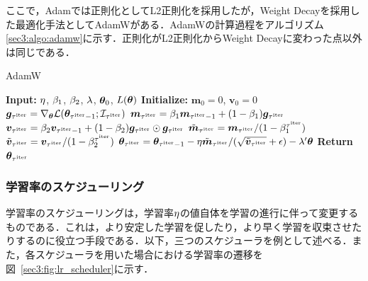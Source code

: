 \documentclass[12pt]{jarticle}
\numberwithin{equation}{section}    %
\numberwithin{figure}{section}      %
\numberwithin{table}{section}      %
\begin{document}
ここで，Adamでは正則化としてL2正則化を採用したが，Weight Decayを採用した最適化手法としてAdamW\cite{loshchilov2017decoupled}がある．AdamWの計算過程をアルゴリズム\ref{sec3:algo:adamw}に示す．正則化がL2正則化からWeight Decayに変わった点以外は同じである．
\begin{algorithm}
    \caption{AdamW}
    \label{sec3:algo:adamw}
    \begin{algorithmic}[1]
        \State \textbf{Input:} $\eta$, $\beta_{1}$, $\beta_{2}$, $\lambda$, $\bm{\theta}_{0}$, $L(\bm{\theta})$
        \State \textbf{Initialize:} $\bm{m}_{0} = 0$, $\bm{v}_{0} = 0$
        \State $\bm{g}_{\tau^{\text{iter}}} = \nabla_{\bm{\theta}} \mathcal{L}(\bm{\theta}_{\tau^{\text{iter}} - 1}; \mathcal{I}_{\tau^{\text{iter}}})$
        \State $\bm{m}_{\tau^{\text{iter}}} = \beta_{1} \bm{m}_{\tau^{\text{iter}} - 1} + (1 - \beta_{1}) \bm{g}_{\tau^{\text{iter}}}$
        \State $\bm{v}_{\tau^{\text{iter}}} = \beta_{2} \bm{v}_{\tau^{\text{iter}} - 1} + (1 - \beta_{2}) \bm{g}_{\tau^{\text{iter}}} \odot \bm{g}_{\tau^{\text{iter}}}$
        \State $\tilde{\bm{m}}_{\tau^{\text{iter}}} = \bm{m}_{\tau^{\text{iter}}} / (1 - \beta_{1}^{\tau^{\text{iter}}})$
        \State $\tilde{\bm{v}}_{\tau^{\text{iter}}} = \bm{v}_{\tau^{\text{iter}}} / (1 - \beta_{2}^{\tau^{\text{iter}}})$
        \State $\bm{\theta}_{\tau^{\text{iter}}} = \bm{\theta}_{\tau^{\text{iter}} - 1} - \eta \tilde{\bm{m}}_{\tau^{\text{iter}}} / (\sqrt{\tilde{\bm{v}}_{\tau^{\text{iter}}}} + \epsilon) - \lambda' \bm{\theta}$
        \EndFor
        \State \textbf{Return} $\bm{\theta}_{\tau^{\text{iter}}}$
    \end{algorithmic}
\end{algorithm}

\subsubsection{学習率のスケジューリング}
学習率のスケジューリングは，学習率$\eta$の値自体を学習の進行に伴って変更するものである．これは，より安定した学習を促したり，より早く学習を収束させたりするのに役立つ手段である．以下，三つのスケジューラを例として述べる．また，各スケジューラを用いた場合における学習率の遷移を図~\ref{sec3:fig:lr_scheduler}に示す．
\end{document}
